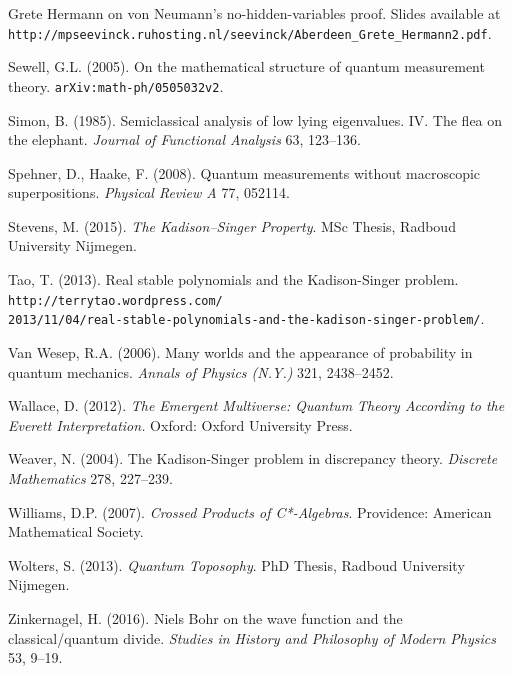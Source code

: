 \documentclass[12pt]{article}
\begin{document}
\begin{footnotesize}
\begin{trivlist}
Grete Hermann on von Neumann's no-hidden-variables proof. Slides available at
\verb#http://mpseevinck.ruhosting.nl/seevinck/Aberdeen_Grete_Hermann2.pdf#.
\item   Sewell, G.L. (2005).  On the mathematical structure of quantum measurement theory.
\texttt{arXiv:math-ph/0505032v2}.
\item   Simon, B. (1985).
Semiclassical analysis of low lying eigenvalues. IV. The flea on the elephant.  \emph{Journal of Functional Analysis}
 63, 123--136.
\item  Spehner, D., Haake,  F. (2008). Quantum measurements without macroscopic superpositions.
\emph{Physical Review A}  77, 052114.
 \item Stevens, M. (2015). \emph{The Kadison--Singer Property}. MSc Thesis, Radboud University Nijmegen. 
 \item Tao, T. (2013). Real stable polynomials and the Kadison-Singer problem. 
\texttt{http://terrytao.wordpress.com/}\\ \texttt{2013/11/04/real-stable-polynomials-and-the-kadison-singer-problem/}.
\item  Van Wesep, R.A. (2006).  Many worlds and the appearance of probability in quantum mechanics.
 \emph{Annals of Physics (N.Y.)} 321, 2438--2452. 
\item Wallace, D. (2012). \emph{The Emergent Multiverse: Quantum Theory According to the Everett Interpretation.}
Oxford: Oxford University Press. 
\item  Weaver, N. (2004). The Kadison-Singer problem in discrepancy theory. \emph{Discrete Mathematics} 278, 227--239.
\item Williams, D.P. (2007). \emph{Crossed Products of C*-Algebras}. Providence: American Mathematical Society. 
\item  Wolters, S. (2013). \emph{Quantum Toposophy}. PhD Thesis, Radboud University Nijmegen. 
\item Zinkernagel, H. (2016). Niels Bohr on the wave function and the classical/quantum divide.
\emph{Studies in History and Philosophy of Modern Physics}  53,  9--19.
\end{trivlist}
\end{footnotesize}
\end{document}
